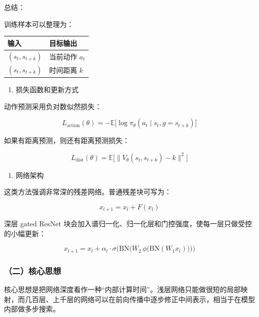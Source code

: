 总结：

训练样本可以整理为：

\begin{longtable}[]{@{}
  >{\raggedright\arraybackslash}p{}
  >{\raggedright\arraybackslash}p{}@{}}
\toprule
输入 & 目标输出 \\
\midrule
\endhead
\((s_t,s_{t+k})\) & 当前动作 \(a_t\) \\
\((s_t,s_{t+k})\) & 时间距离 \(k\) \\
\bottomrule
\end{longtable}

\begin{enumerate}
\def\labelenumi{\arabic{enumi}.}
\setcounter{enumi}{1}
\tightlist
\item
  损失函数和更新方式
\end{enumerate}

动作预测采用负对数似然损失：

\[
L_{\mathrm{action}}(\theta)
=
-
\mathbb{E}
\bigl[
\log \pi_\theta(a_t\mid s_t,g=s_{t+k})
\bigr]
\]

如果有距离预测，则还有距离预测损失：

\[
L_{\mathrm{dist}}(\theta)
=
\mathbb{E}
\bigl[
\lVert
V_\theta(s_t,s_{t+k})-k
\rVert^{2}
\bigr]
\]

\begin{enumerate}
\def\labelenumi{\arabic{enumi}.}
\setcounter{enumi}{2}
\tightlist
\item
  网络架构
\end{enumerate}

这类方法强调非常深的残差网络。普通残差块可写为：

\[
x_{l+1}=x_l+F(x_l)
\]

深层 gated ResNet 块会加入谱归一化、归一化层和门控强度，使每一层只做受控的小幅更新：

\[
x_{l+1}
=
x_l
+
\alpha_l\cdot
\sigma
\bigl(
\mathrm{BN}
\bigl(
W_2\,
\phi
\bigl(
\mathrm{BN}(W_1x_l)
\bigr)
\bigr)
\bigr)
\]

\hypertarget{ux4e8cux6838ux5fc3ux601dux60f3}{%
\subsubsection{（二）核心思想}\label{ux4e8cux6838ux5fc3ux601dux60f3}}

核心思想是把网络深度看作一种``内部计算时间''。浅层网络只能做很短的局部映射，而几百层、上千层的网络可以在前向传播中逐步修正中间表示，相当于在模型内部做多步搜索。

